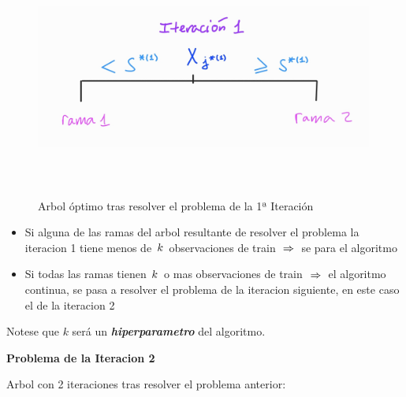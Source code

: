 \documentclass[
  11pt,
  a4paper,
]{article}
\begin{document}
\begin{figure}
\centering
\includegraphics[width=4.375in,height=3.125in]{output_494_0.jpg}
\caption{Arbol óptimo tras resolver el problema de la 1ª Iteración}
\end{figure}

\begin{itemize}
\item
  Si alguna de las ramas del arbol resultante de resolver el problema la
  iteracion 1 tiene menos de \(\hspace{0.05cm}k\hspace{0.05cm}\)
  observaciones de train \(\hspace{0.1cm} \Rightarrow \hspace{0.1cm}\)
  se para el algoritmo
\item
  Si todas las ramas tienen \(\hspace{0.05cm}k\hspace{0.05cm}\) o mas
  observaciones de train \(\hspace{0.1cm} \Rightarrow \hspace{0.1cm}\)
  el algoritmo continua, se pasa a resolver el problema de la iteracion
  siguiente, en este caso el de la iteracion 2
\end{itemize}

Notese que \(k\) será un \textbf{\emph{hiperparametro}} del algoritmo.

\newpage

\textbf{Problema de la Iteracion 2}

Arbol con 2 iteraciones tras resolver el problema anterior:
\end{document}

